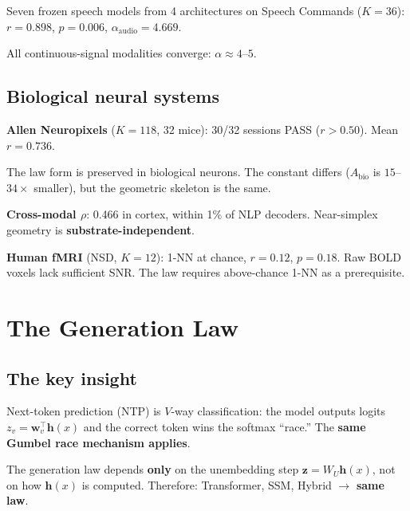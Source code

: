 \documentclass[11pt,a4paper]{article}
\begin{document}
Seven frozen speech models from 4 architectures on Speech Commands ($K{=}36$):
$r = 0.898$, $p = 0.006$, $\alpha_\mathrm{audio} = 4.669$.

All continuous-signal modalities converge: $\alpha \approx 4$--$5$.

\subsection{Biological neural systems}

\textbf{Allen Neuropixels} ($K{=}118$, 32 mice): 30/32 sessions PASS ($r > 0.50$). Mean $r = 0.736$.

The law form is preserved in biological neurons. The constant differs ($A_\mathrm{bio}$ is $15$--$34\times$ smaller), but the geometric skeleton is the same.

\textbf{Cross-modal $\rho$}: 0.466 in cortex, within 1\% of NLP decoders. Near-simplex geometry is \textbf{substrate-independent}.

\begin{warnbox}
\textbf{Human fMRI} (NSD, $K{=}12$): 1-NN at chance, $r = 0.12$, $p = 0.18$. Raw BOLD voxels lack sufficient SNR. The law requires above-chance 1-NN as a prerequisite.
\end{warnbox}

\section{The Generation Law}

\subsection{The key insight}

Next-token prediction (NTP) is $V$-way classification: the model outputs logits $z_v = \mathbf{w}_v^\top \mathbf{h}(x)$ and the correct token wins the softmax ``race.'' The \textbf{same Gumbel race mechanism applies}.

\begin{keybox}
The generation law depends \textbf{only} on the unembedding step $\mathbf{z} = W_U \mathbf{h}(x)$, not on how $\mathbf{h}(x)$ is computed. Therefore: Transformer, SSM, Hybrid $\to$ \textbf{same law}.
\end{keybox}
\end{document}
